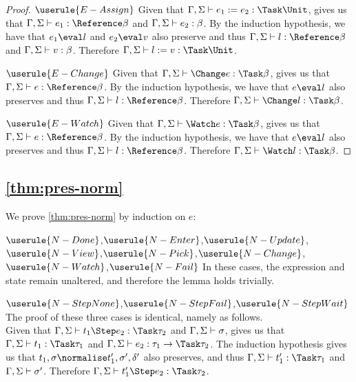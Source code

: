 \begin{proof}
  \case
    {$\userule{E-Assign}$}
    {Given that $\Gamma,\Sigma\infers e_1 := e_2 :\Task \Unit$,  gives us that $\Gamma,\Sigma\infers e_1:\Reference \beta$ and $\Gamma,\Sigma\vdash e_2:\beta$.
    By the induction hypothesis, we have that $e_1\eval l$ and $e_2\eval v$ also preserve and thus $\Gamma,\Sigma\infers l:\Reference \beta$ and $\Gamma,\Sigma\vdash v:\beta$.
    Therefore $\Gamma,\Sigma\infers l:=v:\Task \Unit$. }

  \case
    {$\userule{E-Change}$}
    {Given that $\Gamma,\Sigma\infers \Change e :\Task \beta$,  gives us that $\Gamma,\Sigma\infers e:\Reference \beta$.
    By the induction hypothesis, we have that $e\eval l$ also preserves and thus $\Gamma,\Sigma\infers l:\Reference \beta$.
    Therefore $\Gamma,\Sigma\infers \Change l:\Task\beta$.}

  \case
    {$\userule{E-Watch}$}
    {Given that $\Gamma,\Sigma\infers \Watch e :\Task \beta$,  gives us that $\Gamma,\Sigma\infers e:\Reference \beta$.
    By the induction hypothesis, we have that $e\eval l$ also preserves and thus $\Gamma,\Sigma\infers l:\Reference \beta$.
    Therefore $\Gamma,\Sigma\infers \Watch l:\Task\beta$.}
\end{proof}


\subsection{\cref{thm:pres-norm}}

We prove \cref{thm:pres-norm} by induction on $e$:

\case
  {$\userule{N-Done}$,$\userule{N-Enter}$,$\userule{N-Update}$,$\userule{N-View}$,$\userule{N-Pick}$,$\userule{N-Change}$,$\userule{N-Watch}$,$\userule{N-Fail}$}
  {In these cases, the expression and state remain unaltered, and therefore the lemma holds trivially.}

\case
  {$\userule{N-StepNone}$,$\userule{N-StepFail}$,$\userule{N-StepWait}$}
  {The proof of these three cases is identical, namely as follows.\\
  Given that $\Gamma,\Sigma\infers t_1\Step e_2:\Task\tau_2$ and $\Gamma,\Sigma\vdash \sigma$,  gives us that $\Gamma,\Sigma\infers t_1:\Task\tau_1$ and $\Gamma,\Sigma\infers e_2:\tau_1\to\Task \tau_2$.
  The induction hypothesis gives us that $t_1,\sigma\normalise t_1',\sigma',\delta'$ also preserves, and thus $\Gamma,\Sigma\infers t_1':\Task\tau_1$ and $\Gamma,\Sigma\vdash\sigma'$.
  Therefore $\Gamma,\Sigma\infers t_1'\Step e_2:\Task\tau_2$.}

